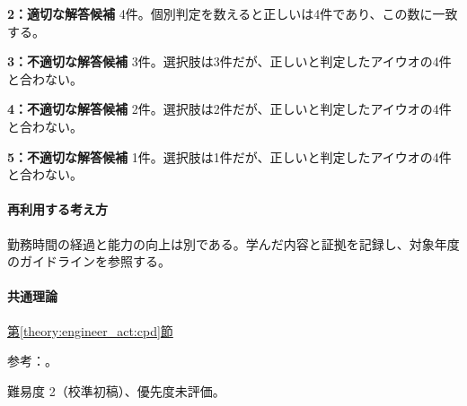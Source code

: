 \noindent\textbf{2：適切な解答候補} 4件。個別判定を数えると正しいは4件であり、この数に一致する。\par

\noindent\textbf{3：不適切な解答候補} 3件。選択肢は3件だが、正しいと判定したアイウオの4件と合わない。\par

\noindent\textbf{4：不適切な解答候補} 2件。選択肢は2件だが、正しいと判定したアイウオの4件と合わない。\par

\noindent\textbf{5：不適切な解答候補} 1件。選択肢は1件だが、正しいと判定したアイウオの4件と合わない。\par

\paragraph{再利用する考え方} 勤務時間の経過と能力の向上は別である。学んだ内容と証拠を記録し、対象年度のガイドラインを参照する。

\paragraph{共通理論} \hyperref[theory:engineer_act:cpd]{第\ref*{theory:engineer_act:cpd}節}

\par 参考：\cite{cpd_new2021,cpd_v3}。

\par 難易度 2（校準初稿）、優先度未評価。
